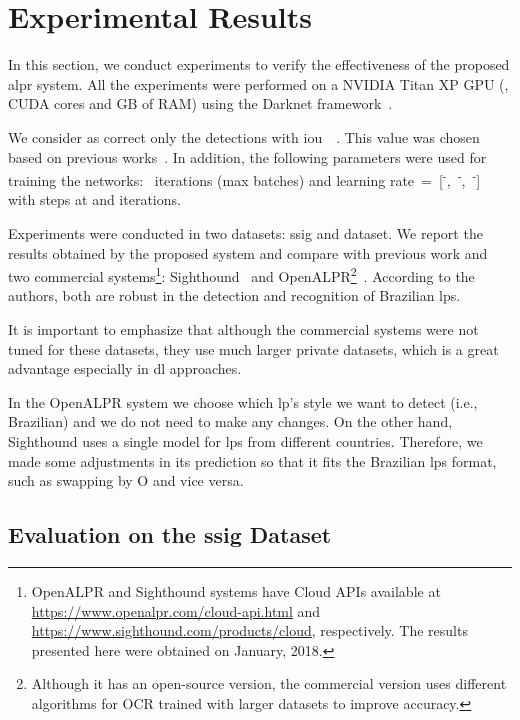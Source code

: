 \section{Experimental Results}
\label{sec:results}

In this section, we conduct experiments to verify the effectiveness of the proposed \gls*{alpr} system. All the experiments were performed on a NVIDIA Titan XP GPU (, CUDA cores and  GB of RAM) using the Darknet framework~\cite{darknet13}.

We consider as correct only the detections with \gls*{iou}~~. This value was chosen based on previous works~\cite{montazzolli2017,li2017towards,yuan2017}. In addition, the following parameters were used for training the networks:~ iterations (max batches) and learning rate~=~[\textsuperscript{-},~\textsuperscript{-},~\textsuperscript{-}] with steps at  and  iterations.

Experiments were conducted in two datasets: \gls*{ssig} and \acrshort*{dataset}. We report the results obtained by the proposed system and compare with previous work and two commercial systems\footnote{OpenALPR and Sighthound systems have Cloud APIs available at \url{https://www.openalpr.com/cloud-api.html} and \url{https://www.sighthound.com/products/cloud}, respectively. The results presented here were obtained on January, 2018.}: Sighthound~\cite{masood2017sighthound} and OpenALPR\footnote{Although it has an open-source version, the commercial version uses different algorithms for OCR trained with larger datasets to improve accuracy.}~\cite{openalpr}. According to the authors, both are robust in the detection and recognition of Brazilian \glspl*{lp}. 

It is important to emphasize that although the commercial systems were not tuned for these datasets, they use much larger private datasets, which is a great advantage especially in \gls*{dl} approaches. 

In the OpenALPR system we choose which \gls*{lp}'s style we want to detect (i.e., Brazilian) and we do not need to make any changes. On the other hand, Sighthound uses a single model for \glspl*{lp} from different countries. Therefore, we made some adjustments in its prediction so that it fits the Brazilian \glspl*{lp} format, such as swapping  by O and vice versa.

\subsection{Evaluation on the \gls*{ssig} Dataset}
\label{ssig:results_ssig}

